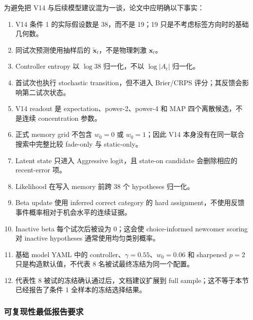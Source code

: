为避免把 V14 与后续模型建议混为一谈，论文中应明确以下事实：
\begin{enumerate}
    \item V14 条件 1 的实际假设数是 38，而不是 19；19 只是不考虑标签方向时的基础几何数。
    \item 同试次预测使用抽样后的 $\widetilde{\mathbf x}_t$，不是物理刺激 $\mathbf x_t$。
    \item Controller entropy 以 $\log38$ 归一化，不以 $\log|A_t|$ 归一化。
    \item 首试次也执行 stochastic transition，但不进入 Brier/CRPS 评分；其反馈会影响第二试次状态。
    \item V14 readout 是 expectation、power-2、power-4 和 MAP 四个离散候选，不是连续 concentration 参数。
    \item 正式 memory grid 不包含 $w_0=0$ 或 $w_0=1$；因此 V14 本身没有在同一联合搜索中完整比较 fade-only 与 static-only。
    \item Latent state 只进入 Aggressive logit，且 state-on candidate 会删除相应的 recent-error 项。
    \item Likelihood 在写入 memory 前跨 38 个 hypotheses 归一化。
    \item Beta update 使用 inferred correct category 的 hard assignment，不使用反馈事件概率相对于机会水平的连续证据。
    \item Inactive beta 每个试次后被设为 0；这会使 choice-informed newcomer scoring 对 inactive hypotheses 通常使用均匀类别概率。
    \item 基础 model YAML 中的 controller、$\gamma=0.55$、$w_0=0.06$ 和 sharpened $p=2$ 只是构造默认值，不代表 8 名被试最终冻结为同一个配置。
    \item 代表性 8 被试的冻结确认通过后，文档建议扩展到 full sample；这不等于本节已经报告了条件 1 全样本的冻结选择结果。
\end{enumerate}


\subsubsection{可复现性最低报告要求}


